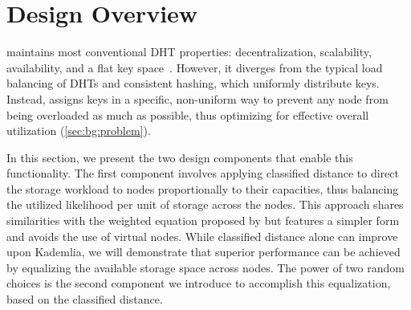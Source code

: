 \section{Design Overview}
\label{sec:overview}

 


\dht maintains most conventional DHT properties: decentralization, scalability, availability, and a flat key space~\cite{chord}.
However, it diverges from the typical load balancing of DHTs and consistent hashing, which uniformly distribute keys.
Instead, \dht assigns keys in a specific, non-uniform way to prevent any node from being overloaded as much as possible, thus optimizing for effective overall utilization (\autoref{sec:bg:problem}).

In this section, we present the two design components that enable this functionality.
The first component involves applying classified distance to direct the storage workload to nodes proportionally to their capacities, thus balancing the utilized likelihood per unit of storage across the nodes.
This approach shares similarities with the weighted equation proposed by \cite{schindelhauer2005weighted} but features a simpler form and avoids the use of virtual nodes.
While classified distance alone can improve upon Kademlia, we will demonstrate that superior performance can be achieved by equalizing the available storage space across nodes.
The power of two random choices is the second component we introduce to accomplish this equalization, based on the classified distance.

